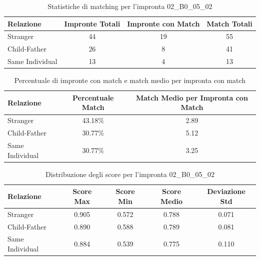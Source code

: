 \begin{table}[htbp]
\centering
\caption{Statistiche di matching per l'impronta 02\_B0\_05\_02}
\label{tab:results_02_B0_05_02}
\begin{tabular}{|l|c|c|c|}
\hline
\textbf{Relazione} & \textbf{Impronte Totali} & \textbf{Impronte con Match} & \textbf{Match Totali} \\
\hline
Stranger & 44 & 19 & 55 \\
\hline
Child-Father & 26 & 8 & 41 \\
\hline
Same Individual & 13 & 4 & 13 \\
\hline
\end{tabular}
\end{table}


\begin{table}[htbp]
\centering
\caption{Percentuale di impronte con match e match medio per impronta con match}
\label{tab:match_percentage_02_B0_05_02}
\begin{tabular}{|l|c|c|}
\hline
\textbf{Relazione} & \textbf{Percentuale Match} & \textbf{Match Medio per Impronta con Match} \\
\hline
Stranger & 43.18\% & 2.89 \\
\hline
Child-Father & 30.77\% & 5.12 \\
\hline
Same Individual & 30.77\% & 3.25 \\
\hline
\end{tabular}
\end{table}


\begin{table}[htbp]
\centering
\caption{Distribuzione degli score per l'impronta 02\_B0\_05\_02}
\label{tab:scores_02_B0_05_02}
\begin{tabular}{|l|c|c|c|c|}
\hline
\textbf{Relazione} & \textbf{Score Max} & \textbf{Score Min} & \textbf{Score Medio} & \textbf{Deviazione Std} \\
\hline
Stranger & 0.905 & 0.572 & 0.788 & 0.071 \\
\hline
Child-Father & 0.890 & 0.588 & 0.789 & 0.081 \\
\hline
Same Individual & 0.884 & 0.539 & 0.775 & 0.110 \\
\hline
\end{tabular}
\end{table}


